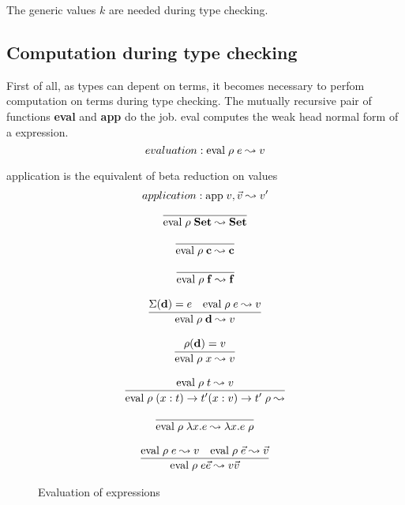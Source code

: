 The generic values $k$ are needed during type checking.
\subsection{Computation during type checking}
First of all, as types can depent on terms, it becomes necessary to perfom computation on terms during type checking.
The mutually recursive pair of functions 
\textbf{eval} and \textbf{app} do the job.
eval computes the weak head normal form of a expression.
\[ evaluation : \mathrm{eval}\;\rho\;e\leadsto v\]

application is the equivalent of beta reduction on values
\[ application : \mathrm{app}\;v,\vec{v}\leadsto v'\]


\begin{figure}

\[\begin{array}{c}
	  \infer{\Eval{\rho}{\Set}{\Set}} 
          {} 
\end{array}
\]

\[
\begin{array}{c}
	  \infer{\Eval{\rho}{\cc}{\cc}} 
          {}

\end{array}
\]

\[\begin{array}{c}
	  \infer{\Eval{\rho}{\ff}{\ff}} 
          {} 
\end{array}
\]

\[\begin{array}{c}
	  \infer{\Eval{\rho}{\dd}{v}} 
          {\Lookup{\Sigma}{\dd}{e} & \Eval{\rho}{e}{v}} 
\end{array}
\]

\[\begin{array}{c}
	  \infer{\Eval{\rho}{x}{v}} 
          {\Lookup{\rho}{\dd}{v}} 
\end{array}
\]

\[\begin{array}{c}
	  \infer{\Eval{\rho}{\EPi{x}{t}{t'}{\VPi{x}{v}{t'}{\rho}}}}
          {\Eval{\rho}{t}{v}}
\end{array}
\]

\[\begin{array}{c}
	  \infer{\Eval{\rho}{\lam x . e}{\VLam{x}{e}{\rho}}}
		{} 
\end{array}
\]


\[
\begin{array}{c}
          
	  \infer{\Eval{\rho}{e \vec{e}}{v \vec{v}}}
          {\Eval{\rho}{e}{v} & \Eval{\rho}{\vec{e}}{\vec{v}}}
\end{array}
\]
\caption{Evaluation of expressions}
\end{figure}

